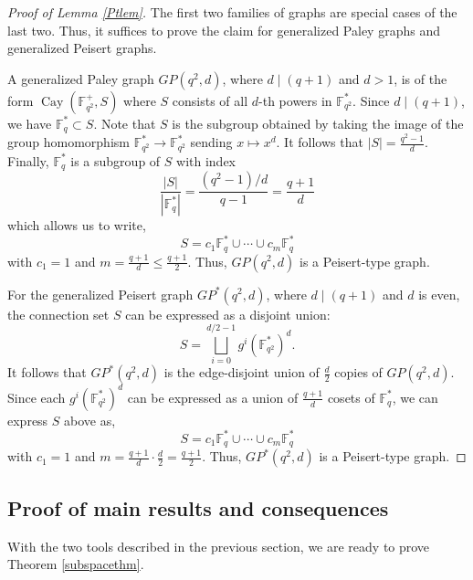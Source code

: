 \documentclass[12pt,reqno]{amsart}
\theoremstyle{definition}
\newcommand{\F}{\mathbb{F}}
\begin{document}
\begin{proof}[Proof of Lemma \ref{Ptlem}]
The first two families of graphs are special cases of the last two. Thus, it suffices to prove the claim for generalized Paley graphs and generalized Peisert graphs. 

A generalized Paley graph $GP(q^2,d)$, where $d \mid (q+1)$ and $d>1$, is of the form $\operatorname{Cay}(\F_{q^2}^{+}, S)$ where $S$ consists of all $d$-th powers in $\F_{q^2}^{\ast}$. Since $d\mid (q+1)$, we have $\F_q^{\ast}\subset S$.  Note that $S$ is the subgroup obtained by taking the image of the group homomorphism $\F_{q^2}^{\ast}\to\F_{q^2}^{\ast}$ sending $x\mapsto x^d$. It follows that $|S|=\frac{q^2-1}{d}$. Finally, $\F_{q}^{\ast}$ is a subgroup of $S$ with index
$$
\frac{|S|}{|\F_q^{\ast}|} = \frac{(q^2-1)/d}{q-1}=\frac{q+1}{d}
$$
which allows us to write,
$$
S=c_1 \F_q^{\ast} \cup \cdots \cup c_m \F_q^{\ast}
$$
with $c_1=1$ and $m=\frac{q+1}{d}\leq \frac{q+1}{2}$. Thus, $GP(q^2,d)$ is a Peisert-type graph.

For the generalized Peisert graph $GP^*(q^2,d)$, where $d \mid (q+1)$ and $d$ is even, the connection set $S$ can be expressed as a disjoint union:
$$
S = \bigsqcup_{i=0}^{d/2-1} g^{i} (\F_{q^2}^{\ast})^d. 
$$
It follows that $GP^*(q^2,d)$ is the edge-disjoint union of $\frac{d}{2}$ copies of $GP(q^2, d)$. Since each $g^{i} (\F_{q^2}^{\ast})^d$ can be expressed as a union of $\frac{q+1}{d}$ cosets of $\F_q^{\ast}$, we can express $S$ above as,
$$
S=c_1 \F_q^{\ast} \cup \cdots \cup c_m \F_q^{\ast}
$$
with $c_1=1$ and $m=\frac{q+1}{d} \cdot \frac{d}{2}=\frac{q+1}{2}$. Thus, $GP^*(q^2,d)$ is a Peisert-type graph.
\end{proof}

\subsection{Proof of main results and consequences}\label{subsect-proof-main-results}
With the two tools described in the previous section, we are ready to prove Theorem \ref{subspacethm}. 
\end{document}
